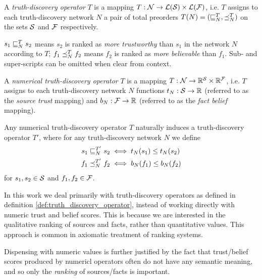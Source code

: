 \documentclass[../main.tex]{subfiles}
\begin{document}
\begin{definition}
\label{def:truth_discovery_operator}

A \emph{truth-discovery operator} $T$ is a mapping $T: \N \rightarrow
\orderings(\S) \times \orderings(\F)$, i.e. $T$ assigns to each truth-discovery
network $N$ a pair of total preorders $T(N) = (\sle_N^T, \fle_N^T)$ on the sets
$\S$ and $\F$ respectively.

$s_1 \sle_N^T s_2$ means $s_2$ is ranked as \emph{more trustworthy} than $s_1$
in the network $N$ according to $T$; $f_1 \fle_N^T f_2$ means $f_2$ is ranked
as \emph{more believable} than $f_1$. Sub- and super-scripts can be omitted
when clear from context.

\end{definition}

\begin{definition}
\label{def:numerical}

A \emph{numerical truth-discovery operator} $T$ is a mapping $T: \N \rightarrow
\R^\S \times \R^\F$, i.e. $T$ assigns to each truth-discovery network $N$
functions $t_N: \S \rightarrow \R$ (referred to as the \emph{source trust}
mapping) and $b_N: \F \rightarrow \R$ (referred to as the \emph{fact belief}
mapping).

\end{definition}

\begin{remark}
    Any numerical truth-discovery operator $T$ naturally induces a
    truth-discovery operator $T'$, where for any truth-discovery network $N$
    we define
    \begin{align*}
    s_1 \sle_N^{T'} s_2 & \iff t_N(s_1) \le t_N(s_2) \\
    f_1 \fle_N^{T'} f_2 & \iff b_N(f_1) \le b_N(f_2)
    \end{align*}
    for $s_1, s_2 \in \S$ and $f_1, f_2 \in \F$.
\end{remark}

In this work we deal primarily with truth-discovery operators as defined in
definition \ref{def:truth_discovery_operator}, instead of working directly
with numeric trust and belief scores. This is because we are interested in the
qualitative ranking of sources and facts, rather than quantitative values. This
approach is common in axiomatic treatment of ranking
systems{\cite{altman,altman_personalised}}. 

Dispensing with numeric values is further justified by the fact that
trust/belief scores produced by numericl operators often do not have any
semantic meaning\cite{pasternack}, and so only the \emph{ranking} of
sources/facts is important.
\end{document}
